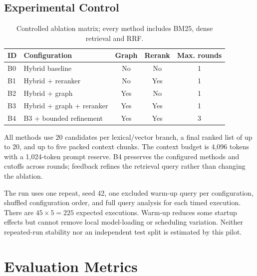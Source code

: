 \subsection{Experimental Control}
\begin{table}[H]\centering\small
\caption{Controlled ablation matrix; every method includes BM25, dense retrieval and RRF.}\label{tab:matrix}
\begin{tabularx}{\textwidth}{lYccc}\toprule
\textbf{ID} & \textbf{Configuration} & \textbf{Graph} & \textbf{Rerank} & \textbf{Max. rounds}\\\midrule
B0 & Hybrid baseline & No & No & 1\\
B1 & Hybrid + reranker & No & Yes & 1\\
B2 & Hybrid + graph & Yes & No & 1\\
B3 & Hybrid + graph + reranker & Yes & Yes & 1\\
B4 & B3 + bounded refinement & Yes & Yes & 3\\\bottomrule
\end{tabularx}
\end{table}
All methods use 20 candidates per lexical/vector branch, a final ranked list of up to 20, and up to five packed context chunks. The context budget is 4,096 tokens with a 1,024-token prompt reserve. B4 preserves the configured methods and cutoffs across rounds; feedback refines the retrieval query rather than changing the ablation.

The run uses one repeat, seed 42, one excluded warm-up query per configuration, shuffled configuration order, and full query analysis for each timed execution. There are $45\times5=225$ expected executions. Warm-up reduces some startup effects but cannot remove local model-loading or scheduling variation. Neither repeated-run stability nor an independent test split is estimated by this pilot.

\section{Evaluation Metrics}
